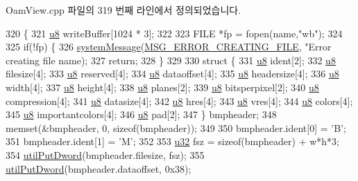 Oam\+View.\+cpp 파일의 319 번째 라인에서 정의되었습니다.


\begin{DoxyCode}
320 \{
321   \mbox{\hyperlink{_system_8h_aed742c436da53c1080638ce6ef7d13de}{u8}} writeBuffer[1024 * 3];
322   
323   FILE *fp = fopen(name,\textcolor{stringliteral}{"wb"});
324 
325   \textcolor{keywordflow}{if}(!fp) \{
326     \mbox{\hyperlink{system_8cpp_a747a9cb8e015a3d45cca636b5bd0fc69}{systemMessage}}(\mbox{\hyperlink{_n_l_s_8h_a165f1f2539e202f0a24e6e9583c63475}{MSG\_ERROR\_CREATING\_FILE}}, \textcolor{stringliteral}{"Error creating file %
      name);
327     \textcolor{keywordflow}{return};
328   \}
329 
330   \textcolor{keyword}{struct }\{
331     \mbox{\hyperlink{_system_8h_aed742c436da53c1080638ce6ef7d13de}{u8}} ident[2];
332     \mbox{\hyperlink{_system_8h_aed742c436da53c1080638ce6ef7d13de}{u8}} filesize[4];
333     \mbox{\hyperlink{_system_8h_aed742c436da53c1080638ce6ef7d13de}{u8}} reserved[4];
334     \mbox{\hyperlink{_system_8h_aed742c436da53c1080638ce6ef7d13de}{u8}} dataoffset[4];
335     \mbox{\hyperlink{_system_8h_aed742c436da53c1080638ce6ef7d13de}{u8}} headersize[4];
336     \mbox{\hyperlink{_system_8h_aed742c436da53c1080638ce6ef7d13de}{u8}} width[4];
337     \mbox{\hyperlink{_system_8h_aed742c436da53c1080638ce6ef7d13de}{u8}} height[4];
338     \mbox{\hyperlink{_system_8h_aed742c436da53c1080638ce6ef7d13de}{u8}} planes[2];
339     \mbox{\hyperlink{_system_8h_aed742c436da53c1080638ce6ef7d13de}{u8}} bitsperpixel[2];
340     \mbox{\hyperlink{_system_8h_aed742c436da53c1080638ce6ef7d13de}{u8}} compression[4];
341     \mbox{\hyperlink{_system_8h_aed742c436da53c1080638ce6ef7d13de}{u8}} datasize[4];
342     \mbox{\hyperlink{_system_8h_aed742c436da53c1080638ce6ef7d13de}{u8}} hres[4];
343     \mbox{\hyperlink{_system_8h_aed742c436da53c1080638ce6ef7d13de}{u8}} vres[4];
344     \mbox{\hyperlink{_system_8h_aed742c436da53c1080638ce6ef7d13de}{u8}} colors[4];
345     \mbox{\hyperlink{_system_8h_aed742c436da53c1080638ce6ef7d13de}{u8}} importantcolors[4];
346     \mbox{\hyperlink{_system_8h_aed742c436da53c1080638ce6ef7d13de}{u8}} pad[2];
347   \} bmpheader;
348   memset(&bmpheader, 0, \textcolor{keyword}{sizeof}(bmpheader));
349 
350   bmpheader.ident[0] = \textcolor{charliteral}{'B'};
351   bmpheader.ident[1] = \textcolor{charliteral}{'M'};
352 
353   \mbox{\hyperlink{_system_8h_a10e94b422ef0c20dcdec20d31a1f5049}{u32}} fsz = \textcolor{keyword}{sizeof}(bmpheader) + w*h*3;
354   \mbox{\hyperlink{_util_8cpp_a61ef2cbdb9d8b5c50004ebd1557439c7}{utilPutDword}}(bmpheader.filesize, fsz);
355   \mbox{\hyperlink{_util_8cpp_a61ef2cbdb9d8b5c50004ebd1557439c7}{utilPutDword}}(bmpheader.dataoffset, 0x38);
}
\end{DoxyCode}
